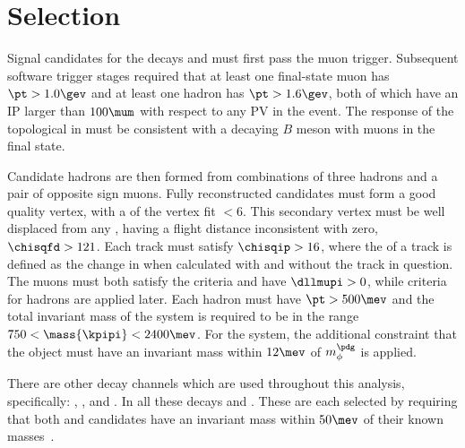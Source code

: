 \section{Selection}
\label{sec:hhh:sel}

Signal candidates for the decays \btokpipimumu and \btophikmumu must first pass the \lone muon
trigger.
Subsequent software trigger stages required that at least one final-state muon has $\pt>1.0\gev$
and at least one hadron has $\pt>1.6\gev$, both of which have an IP larger than $100\mum$ with
respect to any PV in the event.
The response of the topological \BBDT in \hlttwo must be consistent with a decaying $B$ meson
with muons in the final state.


Candidate \Bp hadrons are then formed from combinations of three hadrons and a pair of opposite
sign muons.
Fully reconstructed candidates must form a good quality vertex, with a \chisq of the vertex fit
$<6$.
This secondary vertex must be well displaced from any \PV, having a flight distance inconsistent
with zero, $\chisqfd>121$.
Each track must satisfy $\chisqip>16$, where the \chisqip of a track is defined as the change in
\chisqip when calculated with and without the track in question.
The muons must both satisfy the \ismuon criteria and have $\dllmupi>0$,
while \pid criteria for hadrons are applied later.
Each hadron must have $\pt>500\mev$ and
the total invariant mass of the \kpipi system is required to be in the range
$750<\mass{\kpipi}<2400\mev$.
For the \phik system, the additional constraint that the \decay{\phi}{\kk} object must have an
invariant mass within $12\mev$ of $m_\phi^\pdg$ is applied.

There are other decay channels which are used throughout this analysis, specifically:
\btojpsikpipi, \btopsitwosk, and \btojpsiphik.
In all these decays \psitwostojpsipipi and \jpsitomumu.
These are each selected by requiring that both \jpsi and \psitwos candidates have an invariant
mass within $50\mev$ of their known masses~\cite{PDG2012}.



